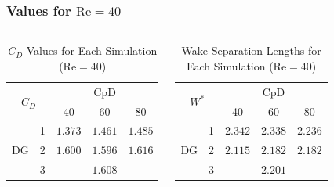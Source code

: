 \begin{frame}[allowframebreaks]
	\frametitle{Values for $\text{Re}=40$}
	\begin{columns}
		\column{6cm}
\begin{table}[htp]
	\centering
	\def\arraystretch{1.5}
	\begin{tabular}{|c|c|c|c|c|}
		\hline
		\multicolumn{2}{|c|}{\multirow{2}{*}{$C_D$}} & \multicolumn{3}{c|}{CpD} \\ \cline{3-5} 
		\multicolumn{2}{|c|}{}                       & 40     & 60    & 80    \\ \hline
		\multirow{3}{*}{DG}            & 1           &   $1.373$     &     $1.461$  &     $1.485$   \\ \cline{2-5} 
		& 2           &     $1.600$   &   $1.596$    &     $1.616$   \\ \cline{2-5} 
		& 3           &      -  &     $1.608$  &     -   \\ \hline
	\end{tabular}
	\caption[$C_D$ Values for each simulation]{$C_D$ Values for Each Simulation ($\text{Re} = 40$)}	
	\label{C_D40}
\end{table}
		\column{6cm}
	\begin{table}[htp]
		\centering
		\def\arraystretch{1.5}
		\begin{tabular}{|c|c|c|c|c|}
			\hline
			\multicolumn{2}{|c|}{\multirow{2}{*}{$W^*$}} & \multicolumn{3}{c|}{CpD} \\ \cline{3-5} 
			\multicolumn{2}{|c|}{}                       & 40     & 60    & 80    \\ \hline
			\multirow{3}{*}{DG}            & 1           &    $2.342$    &    $2.338$   &    $2.236$    \\ \cline{2-5} 
			& 2           &     $2.115$   &    $2.182$   &     $2.182$   \\ \cline{2-5} 
			& 3           &     -   &    $2.201$   &    -    \\ \hline
		\end{tabular}
		\caption{Wake Separation Lengths for Each Simulation ($\text{Re} = 40$)}	
		\label{W40}
	\end{table}
	\end{columns}
	\scalebox{0.8}{
	\begin{minipage}{\the\textwidth}

\end{minipage}}
\end{frame}

